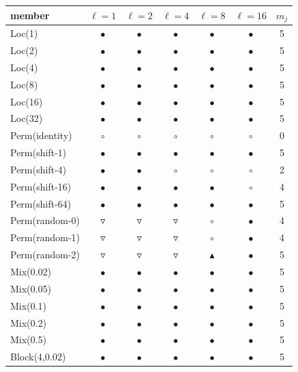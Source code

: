 \begin{ruledtabular}
\begin{tabular}{lcccccc}
member & $\ell{=}1$ & $\ell{=}2$ & $\ell{=}4$ & $\ell{=}8$ & $\ell{=}16$ & $m_j$\\ \hline
Loc(1) & $\bullet$ & $\bullet$ & $\bullet$ & $\bullet$ & $\bullet$ & 5\\
Loc(2) & $\bullet$ & $\bullet$ & $\bullet$ & $\bullet$ & $\bullet$ & 5\\
Loc(4) & $\bullet$ & $\bullet$ & $\bullet$ & $\bullet$ & $\bullet$ & 5\\
Loc(8) & $\bullet$ & $\bullet$ & $\bullet$ & $\bullet$ & $\bullet$ & 5\\
Loc(16) & $\bullet$ & $\bullet$ & $\bullet$ & $\bullet$ & $\bullet$ & 5\\
Loc(32) & $\bullet$ & $\bullet$ & $\bullet$ & $\bullet$ & $\bullet$ & 5\\
Perm(identity) & $\circ$ & $\circ$ & $\circ$ & $\circ$ & $\circ$ & 0\\
Perm(shift-1) & $\bullet$ & $\bullet$ & $\bullet$ & $\bullet$ & $\bullet$ & 5\\
Perm(shift-4) & $\bullet$ & $\bullet$ & $\circ$ & $\circ$ & $\circ$ & 2\\
Perm(shift-16) & $\bullet$ & $\bullet$ & $\bullet$ & $\bullet$ & $\circ$ & 4\\
Perm(shift-64) & $\bullet$ & $\bullet$ & $\bullet$ & $\bullet$ & $\bullet$ & 5\\
Perm(random-0) & $\triangledown$ & $\triangledown$ & $\triangledown$ & $\circ$ & $\bullet$ & 4\\
Perm(random-1) & $\triangledown$ & $\triangledown$ & $\triangledown$ & $\circ$ & $\bullet$ & 4\\
Perm(random-2) & $\triangledown$ & $\triangledown$ & $\triangledown$ & $\blacktriangle$ & $\bullet$ & 5\\
Mix(0.02) & $\bullet$ & $\bullet$ & $\bullet$ & $\bullet$ & $\bullet$ & 5\\
Mix(0.05) & $\bullet$ & $\bullet$ & $\bullet$ & $\bullet$ & $\bullet$ & 5\\
Mix(0.1) & $\bullet$ & $\bullet$ & $\bullet$ & $\bullet$ & $\bullet$ & 5\\
Mix(0.2) & $\bullet$ & $\bullet$ & $\bullet$ & $\bullet$ & $\bullet$ & 5\\
Mix(0.5) & $\bullet$ & $\bullet$ & $\bullet$ & $\bullet$ & $\bullet$ & 5\\
Block(4,0.02) & $\bullet$ & $\bullet$ & $\bullet$ & $\bullet$ & $\bullet$ & 5\\

\end{tabular}
\end{ruledtabular}
